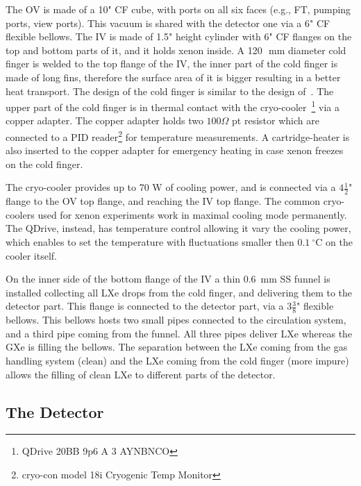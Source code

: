 The OV is made of a 10" CF cube, with ports on all six faces (e.g., FT, pumping ports, 
view ports). This vacuum is shared with the detector one via a 6" CF flexible bellows.
The IV is made of 1.5" height cylinder with 6" CF flanges on the top and bottom parts of it, 
and it holds xenon inside. A 120~\,mm diameter cold finger is welded to the top flange of the IV, 
the inner part of the cold finger is made of long fins, therefore the surface area of it is bigger 
resulting in a better heat transport. The design of the cold finger is similar to the design 
of~\cite{xe100_instr2012}. The upper part of the cold finger is in thermal contact with the 
cryo-cooler~\footnote{QDrive 20BB 9p6 A 3 AYNBNCO} via a copper adapter. The copper adapter 
holds two $100\Omega$ pt resistor which are connected to a PID reader\footnote{cryo-con model 
18i Cryogenic Temp Monitor} for temperature measurements. A cartridge-heater 
is also inserted to the copper adapter for emergency heating in case xenon freezes on the 
cold finger. 

The cryo-cooler provides up to 70 W of cooling power, and is connected via a $4\frac{1}{2}$" 
flange to the OV top flange, and reaching the IV top flange. The common cryo-coolers used for 
xenon experiments work in maximal cooling mode permanently. The QDrive, instead, has 
temperature control allowing it vary the cooling power, which enables to set the temperature 
with fluctuations smaller then $0.1~\mathrm{^{\circ}C}$ on the cooler itself.

On the inner side of the bottom flange of the IV a thin 0.6~mm SS funnel is installed 
collecting all LXe drops from the cold finger, and delivering them to the  detector part. 
This flange is connected to the detector part, via a $3\frac{3}{8}$" flexible bellows. This 
bellows hosts two small pipes connected to the circulation system, and a third pipe coming 
from the funnel. All three pipes deliver LXe whereas the GXe is filling the bellows. The 
separation between the LXe coming from the gas handling system (clean) and the LXe coming 
from the cold finger (more impure) allows the filling of clean LXe to 
different parts of 
the detector. 

\subsection{The Detector}
\label{subsec:det}
 
